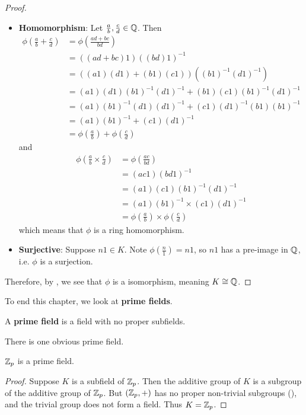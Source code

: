 \begin{proof}
\begin{itemize}
        \item \textbf{Homomorphism}: Let $\frac ab, \frac cd \in \mathbb{Q}$. Then
        \begin{align*}
            \phi\left(\frac ab + \frac cd\right) &= \phi\left(\frac{ad + bc}{bd}\right)\\
            &= ((ad + bc)1)((bd)1)^{-1}\\
            &= \left((a1)(d1) + (b1)(c1)\right)\left((b1)^{-1}(d1)^{-1}\right)\\
            &= (a1)(d1)(b1)^{-1}(d1)^{-1} + (b1)(c1)(b1)^{-1}(d1)^{-1}\\
            &= (a1)(b1)^{-1}(d1)(d1)^{-1} + (c1)(d1)^{-1}(b1)(b1)^{-1}\\
            &= (a1)(b1)^{-1} + (c1)(d1)^{-1}\\
            &= \phi\left(\frac ab\right) + \phi\left(\frac cd\right)
        \end{align*}
        and
        \begin{align*}
            \phi\left(\frac ab \times \frac cd\right) &= \phi\left(\frac{ac}{bd}\right)\\
            &= (ac1)(bd1)^{-1}\\
            &= (a1)(c1)(b1)^{-1}(d1)^{-1}\\
            &= (a1)(b1)^{-1} \times (c1)(d1)^{-1}\\
            &= \phi\left(\frac ab\right) \times \phi\left(\frac cd\right)
        \end{align*}
        which means that $\phi$ is a ring homomorphism.

        \item \textbf{Surjective}: Suppose $n1 \in K$. Note $\phi(\frac n1) = n1$, so $n1$ has a pre-image in $\mathbb{Q}$, i.e. $\phi$ is a surjection.
    \end{itemize}
    Therefore, by , we see that $\phi$ is a isomorphism, meaning $K \cong \mathbb{Q}$.
\end{proof}

To end this chapter, we look at \textbf{prime fields}.

\begin{definition}
    A \textbf{prime field} is a field with no proper subfields.
\end{definition}

There is one obvious prime field.

\begin{theorem}
    $\mathbb{Z}_p$ is a prime field.
\end{theorem}
\begin{proof}
    Suppose $K$ is a subfield of $\mathbb{Z}_p$. Then the additive group of $K$ is a subgroup of the additive group of $\mathbb{Z}_p$. But $(\mathbb{Z}_p, +)$ has no proper non-trivial subgroups (), and the trivial group does not form a field. Thus $K = \mathbb{Z}_p$.
\end{proof}

